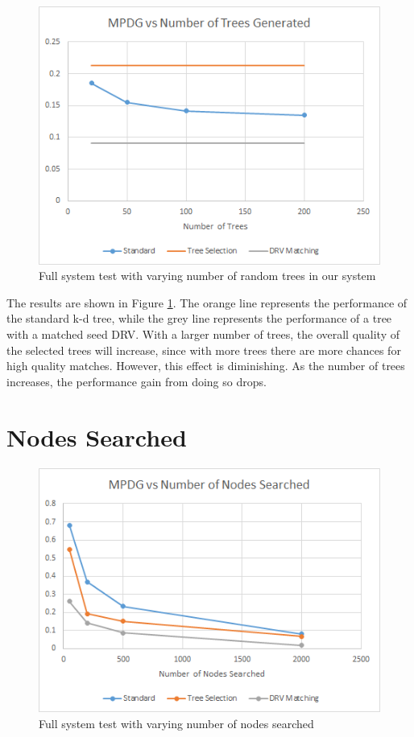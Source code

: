 \begin{figure}[h]
\begin{center}
\includegraphics[width=.85\textwidth]{Figures/ntreesgen}
\end{center}
\caption{Full system test with varying number of random trees in our system}
\label{fig:ntreesgen}
\end{figure}

The results are shown in Figure \ref{fig:ntreesgen}.  The orange line represents the performance of the standard k-d tree, while the grey line represents the performance of a tree with a matched seed DRV.  With a larger number of trees, the overall quality of the selected trees will increase, since with more trees there are more chances for high quality matches.  However, this effect is diminishing.  As the number of trees increases, the performance gain from doing so drops.

\section{Nodes Searched}

\begin{figure}[h]
\begin{center}
\includegraphics[width=.85\textwidth]{Figures/nsearch}
\end{center}
\caption{Full system test with varying number of nodes searched}
\label{fig:nsearch}
\end{figure}

